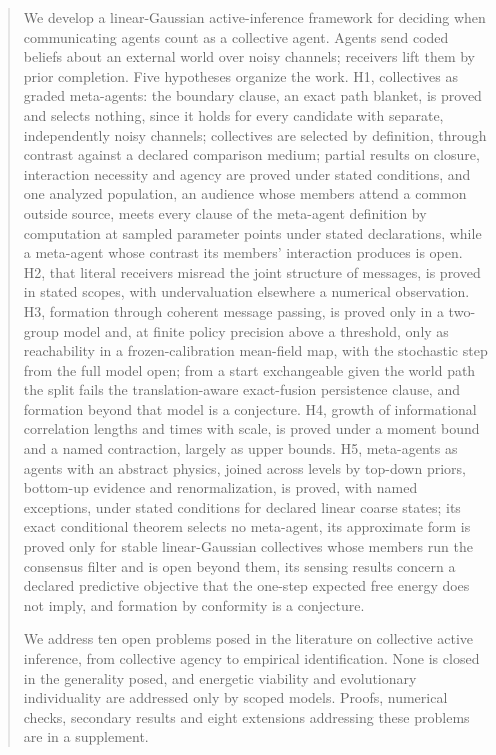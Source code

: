 \begin{abstract}
We develop a linear-Gaussian active-inference framework for deciding when communicating agents count as a collective agent. Agents send coded beliefs about an external world over noisy channels; receivers lift them by prior completion. Five hypotheses organize the work. H1, collectives as graded meta-agents: the boundary clause, an exact path blanket, is proved and selects nothing, since it holds for every candidate with separate, independently noisy channels; collectives are selected by definition, through contrast against a declared comparison medium; partial results on closure, interaction necessity and agency are proved under stated conditions, and one analyzed population, an audience whose members attend a common outside source, meets every clause of the meta-agent definition by computation at sampled parameter points under stated declarations, while a meta-agent whose contrast its members' interaction produces is open. H2, that literal receivers misread the joint structure of messages, is proved in stated scopes, with undervaluation elsewhere a numerical observation. H3, formation through coherent message passing, is proved only in a two-group model and, at finite policy precision above a threshold, only as reachability in a frozen-calibration mean-field map, with the stochastic step from the full model open; from a start exchangeable given the world path the split fails the translation-aware exact-fusion persistence clause, and formation beyond that model is a conjecture. H4, growth of informational correlation lengths and times with scale, is proved under a moment bound and a named contraction, largely as upper bounds. H5, meta-agents as agents with an abstract physics, joined across levels by top-down priors, bottom-up evidence and renormalization, is proved, with named exceptions, under stated conditions for declared linear coarse states; its exact conditional theorem selects no meta-agent, its approximate form is proved only for stable linear-Gaussian collectives whose members run the consensus filter and is open beyond them, its sensing results concern a declared predictive objective that the one-step expected free energy does not imply, and formation by conformity is a conjecture.

We address ten open problems posed in the literature on collective active inference, from collective agency to empirical identification. None is closed in the generality posed, and energetic viability and evolutionary individuality are addressed only by scoped models. Proofs, numerical checks, secondary results and eight extensions addressing these problems are in a supplement.
\end{abstract}
